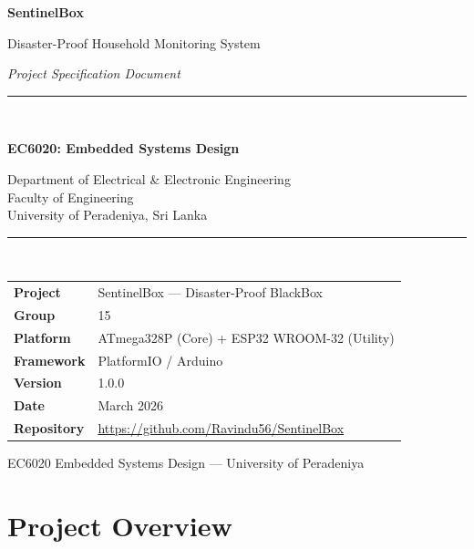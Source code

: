 \documentclass[12pt,a4paper]{article}
\begin{document}

\begin{titlepage}
  \centering
  \vspace*{1.8cm}
  {\Huge\bfseries SentinelBox\par}
  \vspace{0.5cm}
  {\Large Disaster-Proof Household Monitoring System\par}
  \vspace{0.4cm}
  {\large\itshape Project Specification Document\par}
  \vspace{1.8cm}
  \rule{\linewidth}{0.6pt}\\[0.5cm]
  {\large\bfseries EC6020: Embedded Systems Design\par}
  \vspace{0.3cm}
  {\normalsize
    Department of Electrical \& Electronic Engineering\\[0.2cm]
    Faculty of Engineering\\[0.2cm]
    University of Peradeniya, Sri Lanka
  \par}
  \rule{\linewidth}{0.6pt}\\[1.2cm]
  \begin{tabular}{@{}ll@{}}
    \textbf{Project}    & SentinelBox --- Disaster-Proof BlackBox \\[4pt]
    \textbf{Group}      & 15 \\[4pt]
    \textbf{Platform}   & ATmega328P (Core) + ESP32 WROOM-32 (Utility) \\[4pt]
    \textbf{Framework}  & PlatformIO / Arduino \\[4pt]
    \textbf{Version}    & 1.0.0 \\[4pt]
    \textbf{Date}       & March 2026 \\[4pt]
    \textbf{Repository} & \url{https://github.com/Ravindu56/SentinelBox}
  \end{tabular}
  \vfill
  {\small\color{gray} EC6020 Embedded Systems Design --- University of Peradeniya}
\end{titlepage}

\tableofcontents
\newpage

\section{Project Overview}
\end{document}
